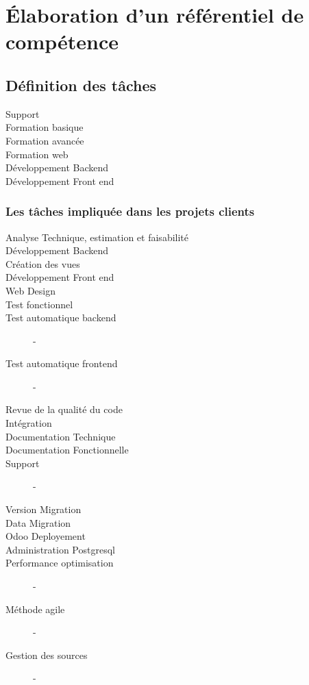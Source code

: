 \chapter{Élaboration d'un référentiel de compétence}
\section{Définition des tâches}

\begin{description}
    \item[Support] 
    \item[Formation basique]
    \item[Formation avancée]
    \item[Formation web]
    \item[Développement Backend]
    \item[Développement Front end]
    
\end{description}

\subsection{Les tâches impliquée dans les projets clients}
\begin{description}
    \item[Analyse Technique, estimation et faisabilité] 
    \item[Développement Backend]
    \item[Création des vues]
    \item[Développement Front end]
    \item[Web Design]
    \item[Test fonctionnel]
    \item[Test automatique backend] -
    \item[Test automatique frontend] -
    \item[Revue de la qualité du code]
    \item[Intégration]
    \item[Documentation Technique]
    \item[Documentation Fonctionnelle]
    \item[Support] -
    \item[Version Migration]
    \item[Data Migration]
    \item[Odoo Deployement]
    \item[Administration Postgresql]
    \item[Performance optimisation] - 
    \item[Méthode agile]       -
    \item[Gestion des sources] -
\end{description}









